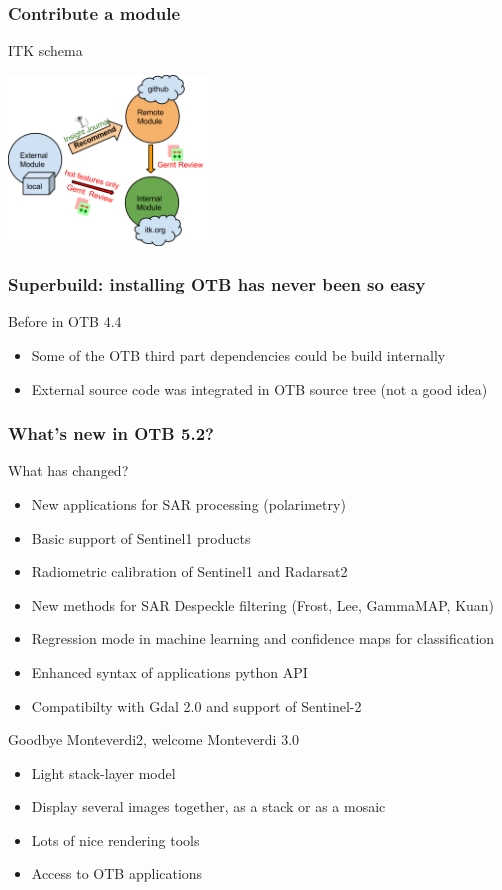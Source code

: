 \documentclass[8pt]{beamer}
\begin{document}
\begin{frame}
\frametitle{Contribute a module}
\begin{block}{ITK schema}
\begin{center}
 \includegraphics[width=0.4\textwidth]{images/itk-remote-module.png}
\end{center}
\end{block}
\end{frame}

\begin{frame}
\frametitle{Superbuild: installing OTB has never been so easy}
\begin{block}{Before in OTB 4.4}
\begin{itemize}
\item Some of the OTB third part dependencies could be build internally
\item External source code was integrated in OTB source tree (not a good idea)
\end{itemize}
\end{block}
\end{frame}

\begin{frame}
\frametitle{What's new in OTB 5.2?}
\begin{block}{What has changed?}
\begin{itemize}
\item New applications for SAR processing (polarimetry)
\item Basic support of Sentinel1 products
\item Radiometric calibration of Sentinel1 and Radarsat2
\item New methods for SAR Despeckle filtering (Frost, Lee, GammaMAP, Kuan)
\item Regression mode in machine learning and confidence maps for classification
\item Enhanced syntax of applications python API
\item Compatibilty with Gdal 2.0 and support of Sentinel-2
\end{itemize}
\end{block}

\begin{block}{Goodbye Monteverdi2, welcome Monteverdi 3.0}
\begin{itemize}
\item Light stack-layer model
\item Display several images together, as a stack or as a mosaic
\item Lots of nice rendering tools
\item Access to OTB applications
\end{itemize}
\end{block}
\end{frame}
\end{document}
